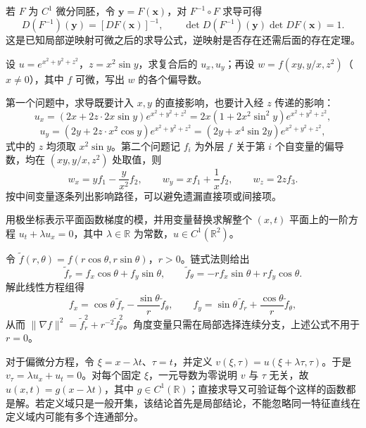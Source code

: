 若 $F$ 为 $C^1$ 微分同胚，令 $\boldsymbol y=F(\boldsymbol x)$，对 $F^{-1}\circ F$ 求导可得
\begin{equation}
\label{eq:inverse-derivative-ch14}
    D(F^{-1})(\boldsymbol y)=[DF(\boldsymbol x)]^{-1},\qquad
    \det D(F^{-1})(\boldsymbol y)\det DF(\boldsymbol x)=1.
\end{equation}
这是已知局部逆映射可微之后的求导公式，逆映射是否存在还需后面的存在定理。

\begin{example}
\label{ex:chain-rule-explicit-abstract-ch14}
设 $u=e^{x^2+y^2+z^2}$，$z=x^2\sin y$，求复合后的 $u_x,u_y$；再设 $w=f(xy,y/x,z^2)$（$x\ne0$），其中 $f$ 可微，写出 $w$ 的各个偏导数。
\end{example}
\begin{solve}
第一个问题中，求导既要计入 $x,y$ 的直接影响，也要计入经 $z$ 传递的影响：
\[
    u_x=(2x+2z\cdot2x\sin y)e^{x^2+y^2+z^2}
        =2x(1+2x^2\sin^2y)e^{x^2+y^2+z^2},
\]
\[
    u_y=(2y+2z\cdot x^2\cos y)e^{x^2+y^2+z^2}
        =(2y+x^4\sin2y)e^{x^2+y^2+z^2},
\]
式中的 $z$ 均须取 $x^2\sin y$。第二个问题记 $f_i$ 为外层 $f$ 关于第 $i$ 个自变量的偏导数，均在 $(xy,y/x,z^2)$ 处取值，则
\[
    w_x=yf_1-\frac{y}{x^2}f_2,\qquad
    w_y=xf_1+\frac1x f_2,\qquad
    w_z=2zf_3.
\]
按中间变量逐条列出影响路径，可以避免遗漏直接项或间接项。
\end{solve}

\begin{example}
\label{ex:polar-gradient-and-transport-ch14}
用极坐标表示平面函数梯度的模，并用变量替换求解整个 $(x,t)$ 平面上的一阶方程 $u_t+\lambda u_x=0$，其中 $\lambda\in\mathbb R$ 为常数，$u\in C^1(\mathbb R^2)$。
\end{example}
\begin{solve}
令 $\widetilde f(r,\theta)=f(r\cos\theta,r\sin\theta)$，$r>0$。链式法则给出
\[
    \widetilde f_r=f_x\cos\theta+f_y\sin\theta,\qquad
    \widetilde f_\theta=-rf_x\sin\theta+rf_y\cos\theta.
\]
解此线性方程组得
\[
    f_x=\cos\theta\,\widetilde f_r-\frac{\sin\theta}{r}\widetilde f_\theta,
    \qquad
    f_y=\sin\theta\,\widetilde f_r+\frac{\cos\theta}{r}\widetilde f_\theta,
\]
从而 $\|\nabla f\|^2=\widetilde f_r^2+r^{-2}\widetilde f_\theta^2$。角度变量只需在局部选择连续分支，上述公式不用于 $r=0$。

对于偏微分方程，令 $\xi=x-\lambda t$、$\tau=t$，并定义 $v(\xi,\tau)=u(\xi+\lambda\tau,\tau)$。于是 $v_\tau=\lambda u_x+u_t=0$。对每个固定 $\xi$，一元导数为零说明 $v$ 与 $\tau$ 无关，故 $u(x,t)=g(x-\lambda t)$，其中 $g\in C^1(\mathbb R)$；直接求导又可验证每个这样的函数都是解。若定义域只是一般开集，该结论首先是局部结论，不能忽略同一特征直线在定义域内可能有多个连通部分。
\end{solve}

